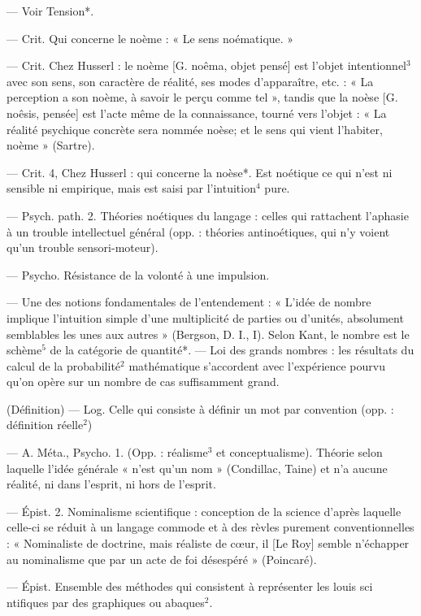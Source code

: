 \begin{itemize}[leftmargin=1cm, label=, itemsep=1pt]
 — Voir Tension*.

 — Crit. Qui concerne le
noème : « Le sens noématique. »

 — Crit. Chez Husserl :
le noème [G. noêma, objet pensé]
est l’objet intentionnel$^3$ avec son
sens, son caractère de réalité, ses
modes d’apparaître, etc. : « La perception a son noème, à savoir le
perçu comme tel », tandis que la
noèse [G. noêsis, pensée] est l’acte
même de la connaissance, tourné
vers l'objet : « La réalité psychique
concrète sera nommée noèse; et le
sens qui vient l'habiter, noème »
(Sartre).

 — Crit. 4, Chez Husserl : qui
concerne la noèse*. Est noétique ce
qui n’est ni sensible ni empirique,
mais est saisi par l'intuition$^4$ pure.

— Psych. path. 2. Théories noétiques du langage : celles qui rattachent l’aphasie à un trouble intellectuel général (opp. : théories antinoétiques, qui n’y voient qu'un
trouble sensori-moteur).

 — Psycho. Résistance de la
volonté à une impulsion.

 — Une des notions fondamentales de l’entendement : « L'idée
de nombre implique l'intuition
simple d’une multiplicité de parties
ou d’unités, absolument semblables
les unes aux autres » (Bergson,
D. I., I). Selon Kant, le nombre est
le schème$^5$ de la catégorie de quantité*. — Loi des grands nombres : les
résultats du calcul de la probabilité$^2$
mathématique s'accordent avec
l'expérience pourvu qu'on opère sur
un nombre de cas suffisamment
grand.

 (Définition) — Log. Celle
qui consiste à définir un mot par
convention (opp. : définition réelle$^2$)

 — A. Méta., Psycho. 1.
(Opp. : réalisme$^3$ et conceptualisme).
Théorie selon laquelle l’idée générale
« n’est qu’un nom » (Condillac,
Taine) et n'a aucune réalité, ni dans
l'esprit, ni hors de l'esprit.

— Épist. 2. Nominalisme scientifique : conception de la science
d'après laquelle celle-ci se réduit
à un langage commode et à des
rèvles purement conventionnelles :
« Nominaliste de doctrine, mais réaliste de cœur, il [Le Roy] semble
n'échapper au nominalisme que par
un acte de foi désespéré » (Poincaré).

 — Épist. Ensemble des
méthodes qui consistent à représenter les louis sci ntifiques par des
graphiques ou abaques$^2$.


\end{itemize}

